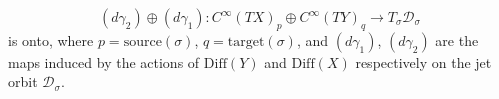 $$(d\gamma_2) \oplus (d\gamma_1): C^\infty(TX)_p \oplus C^\infty(TY)_q \longrightarrow T_\sigma \mathcal{D}_\sigma$$
is onto, where $p = \mathrm{source}(\sigma)$, $q = \mathrm{target}(\sigma)$, and $(d\gamma_1)$, $(d\gamma_2)$ are the maps induced by the actions of $\mathrm{Diff}(Y)$ and $\mathrm{Diff}(X)$ respectively on the jet orbit $\mathcal{D}_\sigma$.

